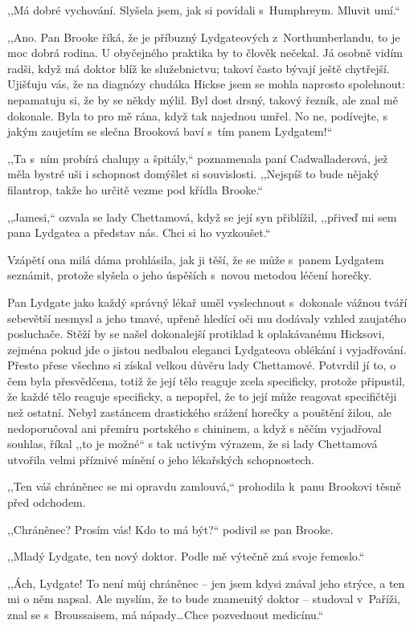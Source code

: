 ,,Má dobré vychování. Slyšela jsem, jak si povídali s Humphreym. Mluvit umí.``

,,Ano. Pan Brooke říká, že je příbuzný Lydgateových z Northumberlandu, to je moc dobrá rodina. U obyčejného praktika by to člověk nečekal. Já osobně vidím radši, když má doktor blíž ke služebnictvu; takoví často bývají ještě chytřejší. Ujišťuju vás, že na diagnózy chudáka Hickse jsem se mohla naprosto spolehnout: nepamatuju si, že by se někdy mýlil. Byl dost drsný, takový řezník, ale znal mě dokonale. Byla to pro mě rána, když tak najednou umřel. No ne, podívejte, s jakým zaujetím se slečna Brooková baví s tím panem Lydgatem!``

,,Ta s ním probírá chalupy a špitály,`` poznamenala paní Cadwalladerová, jež měla bystré uši i schopnost domýšlet si souvislosti. ,,Nejspíš to bude nějaký filantrop, takže ho určitě vezme pod křídla Brooke.``

,,Jamesi,`` ozvala se lady Chettamová, když se její syn přiblížil, ,,přiveď mi sem pana Lydgatea a představ nás. Chci si ho vyzkoušet.``

Vzápětí ona milá dáma prohlásila, jak ji těší, že se může s panem Lydgatem seznámit, protože slyšela o jeho úspěších s novou metodou léčení horečky.  

Pan Lydgate jako každý správný lékař uměl vyslechnout s dokonale vážnou tváří sebevětší nesmysl a jeho tmavé, upřeně hledící oči mu dodávaly vzhled zaujatého posluchače. Stěží by se našel dokonalejší protiklad k oplakávanému Hicksovi, zejména pokud jde o jistou nedbalou eleganci Lydgateova oblékání i vyjadřování. Přesto přese všechno si získal velkou důvěru lady Chettamové. Potvrdil jí to, o čem byla přesvědčena, totiž že její tělo reaguje zcela specificky, protože připustil, že každé tělo reaguje specificky, a nepopřel, že to její může reagovat specifičtěji než ostatní. Nebyl zastáncem drastického srážení horečky a pouštění žilou, ale nedoporučoval ani přemíru portského s chininem, a když s něčím vyjadřoval souhlas, říkal ,,to je možné`` s tak uctivým výrazem, že si lady Chettamová utvořila velmi příznivé mínění o jeho lékařských schopnostech.

,,Ten váš chráněnec se mi opravdu zamlouvá,`` prohodila k panu Brookovi těsně před odchodem. 

,,Chráněnec? Prosím vás! Kdo to má být?`` podivil se pan Brooke. 

,,Mladý Lydgate, ten nový doktor. Podle mě výtečně zná svoje řemeslo.``

,,Ách, Lydgate! To není můj chráněnec -- jen jsem kdysi znával jeho strýce, a ten mi o něm napsal. Ale myslím, že to bude znamenitý doktor -- studoval v Paříži, znal se s Broussaisem, má nápady\ldots Chce pozvednout medicínu.``

